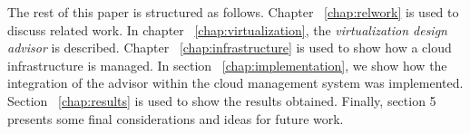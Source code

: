 The rest of this paper is structured as follows. Chapter ~\ref{chap:relwork} is used to discuss related work. In chapter ~\ref{chap:virtualization}, the \textit{virtualization design advisor} is described. Chapter ~\ref{chap:infrastructure} is used to show how a cloud infrastructure is managed. In section ~\ref{chap:implementation}, we show how the integration of the advisor within the cloud management system was implemented. Section ~\ref{chap:results} is used to show the results obtained. Finally, section 5 presents some final considerations and ideas for future work.

